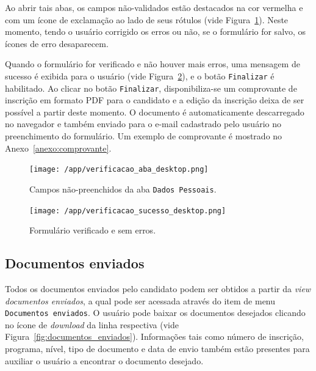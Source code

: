 \documentclass[
  10.5pt,				  %
	openright,			%
	twoside,			  %
  a5paper,
  chapter=TITLE,	%
	section=TITLE,	%
  hyphens,        %
	english,        %
	brazil          %
]{abntex2}
\begin{document}
Ao abrir tais abas, os campos não-validados estão destacados na cor vermelha e com um ícone de exclamação ao lado de seus rótulos (vide Figura~\ref{fig:verificacao_aba}). Neste momento, tendo o usuário corrigido os erros ou não, se o formulário for salvo, os ícones de erro desaparecem.

Quando o formulário for verificado e não houver mais erros, uma mensagem de sucesso é exibida para o usuário (vide Figura~\ref{fig:verificacao_sucesso}), e o botão \texttt{Finalizar} é habilitado. Ao clicar no botão \texttt{Finalizar}, disponibiliza-se um comprovante de inscrição em formato PDF para o candidato e a edição da inscrição deixa de ser possível a partir deste momento. O documento é automaticamente descarregado no navegador e também enviado para o e-mail cadastrado pelo usuário no preenchimento do formulário. Um exemplo de comprovante é mostrado no Anexo~\ref{anexo:comprovante}.

\begin{figure}[!ht]
  \caption{\label{fig:verificacao_aba} Campos não-preenchidos da aba \texttt{Dados Pessoais}.}
  \begin{center}
    \texttt{[image: /app/verificacao\_aba\_desktop.png]}
  \end{center}
\end{figure}


\begin{figure}[!ht]
  \caption{\label{fig:verificacao_sucesso} Formulário verificado e sem erros.}
  \begin{center}
    \texttt{[image: /app/verificacao\_sucesso\_desktop.png]}
  \end{center}
\end{figure}

\subsection{Documentos enviados}\label{sec:documentos_enviados}

Todos os documentos enviados pelo candidato podem ser obtidos a partir da \emph{view documentos enviados}, a qual pode ser acessada através do item de menu \texttt{Documentos enviados}. O usuário pode baixar os documentos desejados clicando no ícone de \emph{download} da linha respectiva (vide Figura~\ref{fig:documentos_enviados}). Informações tais como número de inscrição, programa, nível, tipo de documento e data de envio também estão presentes para auxiliar o usuário a encontrar o documento desejado.
\end{document}
